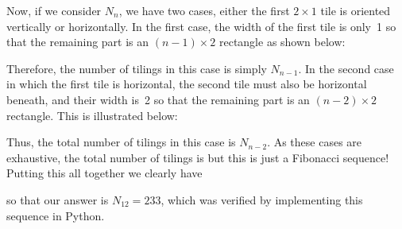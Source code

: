 \documentclass{article}
\begin{document}
{  Now, if we consider $N_n$, we have two cases, either the first $2 \times 1$ tile is oriented vertically or horizontally.
  In the first case, the width of the first tile is only~1 so that the remaining part is an $(n-1) \times 2$ rectangle as shown below:
  \begin{center}
  \end{center}
  Therefore, the number of tilings in this case is simply $N_{n-1}$.
  In the second case in which the first tile is horizontal, the second tile must also be horizontal beneath, and their width is~2 so that the remaining part is an $(n-2) \times 2$ rectangle.
  This is illustrated below:
  \begin{center}
  \end{center}
  Thus, the total number of tilings in this case is $N_{n-2}$.
  As these cases are exhaustive, the total number of tilings is
  but this is just a Fibonacci sequence!
  Putting this all together we clearly have
  \begin{multicols}{3}
    \columnbreak
    \columnbreak
  \end{multicols}
  so that our answer is $N_{12} = 233$, which was verified by implementing this sequence in Python.
}
\end{document}
